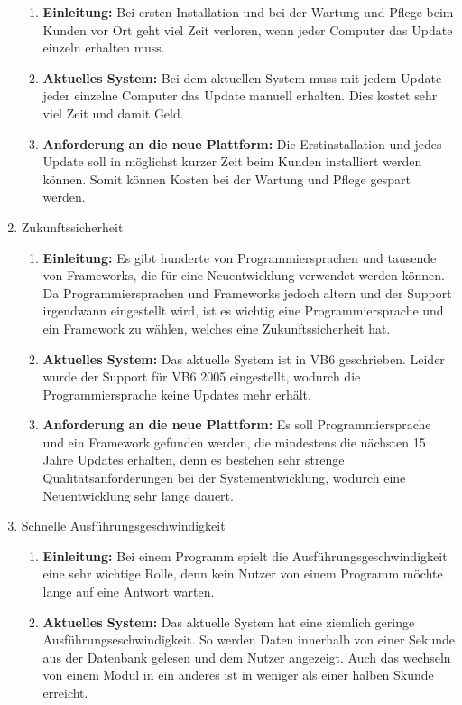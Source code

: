 \documentclass[ngerman]{article}
\begin{document}
\begin{enumerate}
        \begin{enumerate}[label=]
            \item \textbf{Einleitung:} Bei ersten Installation und bei der Wartung und Pflege beim Kunden vor Ort geht viel Zeit verloren, wenn jeder Computer das Update einzeln erhalten muss.
            \item \textbf{Aktuelles System:} Bei dem aktuellen System muss mit jedem Update jeder einzelne Computer das Update manuell erhalten. Dies kostet sehr viel Zeit und damit Geld.
            \item \textbf{Anforderung an die neue Plattform:} Die Erstinstallation und jedes Update soll in möglichst kurzer Zeit beim Kunden installiert werden können. Somit können Kosten bei der Wartung und Pflege gespart werden.
        \end{enumerate}
        \item Zukunftssicherheit
        \begin{enumerate}[label=]
            \item \textbf{Einleitung:} Es gibt hunderte von Programmiersprachen und tausende von Frameworks, die für eine Neuentwicklung verwendet werden können. Da Programmiersprachen und Frameworks jedoch altern und der Support irgendwann eingestellt wird, ist es wichtig eine Programmiersprache und ein Framework zu wählen, welches eine Zukunftssicherheit hat.
            \item \textbf{Aktuelles System:} Das aktuelle System ist in VB6 geschrieben. Leider wurde der Support für VB6 2005 eingestellt, wodurch die Programmiersprache keine Updates mehr erhält.
            \item \textbf{Anforderung an die neue Plattform:} Es soll Programmiersprache und ein Framework gefunden werden, die mindestens die nächsten 15 Jahre Updates erhalten, denn es bestehen sehr strenge Qualitätsanforderungen bei der Systementwicklung, wodurch eine Neuentwicklung sehr lange dauert.
        \end{enumerate}
        \item Schnelle Ausführungsgeschwindigkeit
        \begin{enumerate}[label=]
            \item \textbf{Einleitung:} Bei einem Programm spielt die Ausführungsgeschwindigkeit eine sehr wichtige Rolle, denn kein Nutzer von einem Programm möchte lange auf eine Antwort warten.
            \item \textbf{Aktuelles System:} Das aktuelle System hat eine ziemlich geringe Ausführungseschwindigkeit. So werden Daten innerhalb von einer Sekunde aus der Datenbank gelesen und dem Nutzer angezeigt. Auch das wechseln von einem Modul in ein anderes ist in weniger als einer halben Skunde erreicht.

\end{enumerate}
\end{enumerate}
\end{document}
